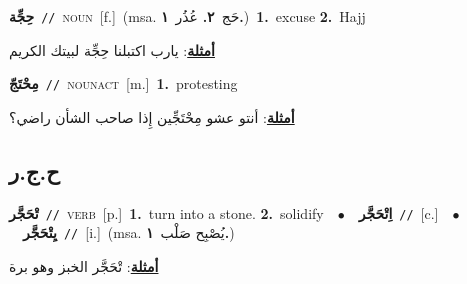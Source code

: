 \documentclass[10pt,a4paper,twoside]{article} %
\begin{document}
\begin{multicols}{2}
{\setlength\topsep{0pt}\textbf{\foreignlanguage{arabic}{حِجِّة}}\ {\color{gray}\texttt{//}\color{black}}\ \textsc{noun}\ [f.]\ \color{gray}(msa. \foreignlanguage{arabic}{حَج}~\foreignlanguage{arabic}{\textbf{٢.}}  \foreignlanguage{arabic}{عُذُر}~\foreignlanguage{arabic}{\textbf{١.}})\color{black}\ \textbf{1.}~excuse  \textbf{2.}~Hajj\  \begin{flushright}\color{gray}\foreignlanguage{arabic}{\textbf{\underline{\foreignlanguage{arabic}{أمثلة}}}: يارب اكتبلنا حِجِّة لبيتك الكريم}\end{flushright}\color{black}} \vspace{2mm}

{\setlength\topsep{0pt}\textbf{\foreignlanguage{arabic}{مِحْتَجّ}}\ {\color{gray}\texttt{//}\color{black}}\ \textsc{noun\textunderscore act}\ [m.]\ \textbf{1.}~protesting\  \begin{flushright}\color{gray}\foreignlanguage{arabic}{\textbf{\underline{\foreignlanguage{arabic}{أمثلة}}}: أنتو عشو مِحْتَجِّين إِذا صاحب الشأن راضي؟}\end{flushright}\color{black}} \vspace{2mm}

\vspace{-3mm}
\subsection*{\color{blue}\foreignlanguage{arabic}{ح.ج.ر}\color{blue}{}} 

{\setlength\topsep{0pt}\textbf{\foreignlanguage{arabic}{تْحَجَّر}}\ {\color{gray}\texttt{//}\color{black}}\ \textsc{verb}\ [p.]\ \textbf{1.}~turn into a stone.  \textbf{2.}~solidify\ \ $\bullet$\ \ \setlength\topsep{0pt}\textbf{\foreignlanguage{arabic}{اِتْحَجَّر}}\ {\color{gray}\texttt{//}\color{black}}\ [c.]\ \ $\bullet$\ \ \setlength\topsep{0pt}\textbf{\foreignlanguage{arabic}{يِتْحَجَّر}}\ {\color{gray}\texttt{//}\color{black}}\ [i.]\ \color{gray}(msa. \foreignlanguage{arabic}{يُصْبِح صَلْب}~\foreignlanguage{arabic}{\textbf{١.}})\color{black}\  \begin{flushright}\color{gray}\foreignlanguage{arabic}{\textbf{\underline{\foreignlanguage{arabic}{أمثلة}}}: تْحَجَّر الخبز وهو برة}\end{flushright}\color{black}} \vspace{2mm}


\end{multicols}
\end{document}
